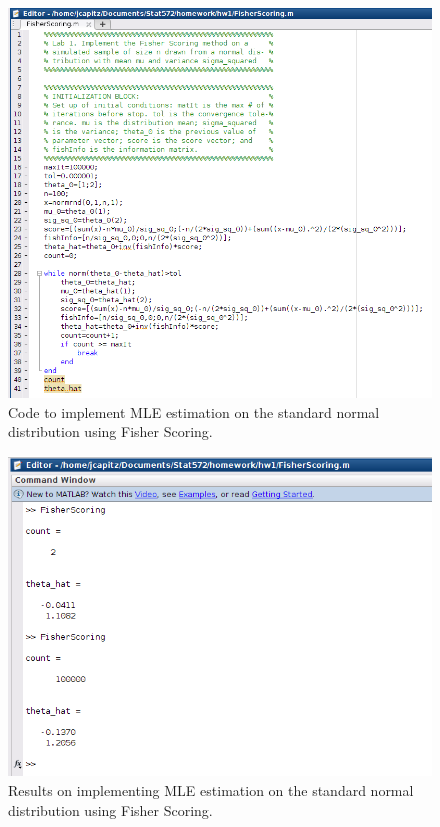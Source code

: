 \documentclass[12pt,a4paper]{article}
\begin{document}
\begin{figure}[ht!]
\includegraphics[scale=.60]{FisherScoringCode.png}
\caption{Code to implement MLE estimation on the standard normal distribution using Fisher Scoring.}
\label{fig1:lab}
\end{figure}

\FloatBarrier

\begin{figure}[ht!]
\includegraphics[scale=.70]{FisherScoringResult.png}
\caption{Results on implementing MLE estimation on the standard normal distribution using Fisher Scoring.}
\label{fig2:lab}
\end{figure}
\end{document}
